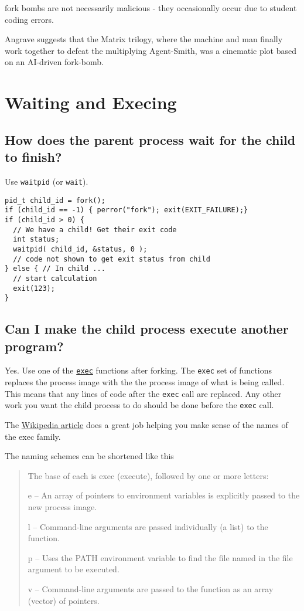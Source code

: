 fork bombs are not necessarily malicious - they occasionally occur due
to student coding errors.

Angrave suggests that the Matrix trilogy, where the machine and man
finally work together to defeat the multiplying Agent-Smith, was a
cinematic plot based on an AI-driven fork-bomb.

\section{Waiting and Execing}\label{waiting-and-execing}

\subsection{How does the parent process wait for the child to
finish?}\label{how-does-the-parent-process-wait-for-the-child-to-finish}

Use \texttt{waitpid} (or \texttt{wait}).

\begin{verbatim}
pid_t child_id = fork();
if (child_id == -1) { perror("fork"); exit(EXIT_FAILURE);}
if (child_id > 0) { 
  // We have a child! Get their exit code
  int status; 
  waitpid( child_id, &status, 0 );
  // code not shown to get exit status from child
} else { // In child ...
  // start calculation
  exit(123);
}
\end{verbatim}

\subsection{Can I make the child process execute another
program?}\label{can-i-make-the-child-process-execute-another-program}

Yes. Use one of the
\href{http://man7.org/linux/man-pages/man3/exec.3.html}{\texttt{exec}}
functions after forking. The \texttt{exec} set of functions replaces the
process image with the the process image of what is being called. This
means that any lines of code after the \texttt{exec} call are replaced.
Any other work you want the child process to do should be done before
the \texttt{exec} call.

The
\href{https://en.wikipedia.org/wiki/Exec_(system_call)\#C_language_prototypes}{Wikipedia
article} does a great job helping you make sense of the names of the
exec family.

The naming schemes can be shortened like this

\begin{quote}
The base of each is exec (execute), followed by one or more letters:

e -- An array of pointers to environment variables is explicitly passed
to the new process image.

l -- Command-line arguments are passed individually (a list) to the
function.

p -- Uses the PATH environment variable to find the file named in the
file argument to be executed.

v -- Command-line arguments are passed to the function as an array
(vector) of pointers.
\end{quote}

